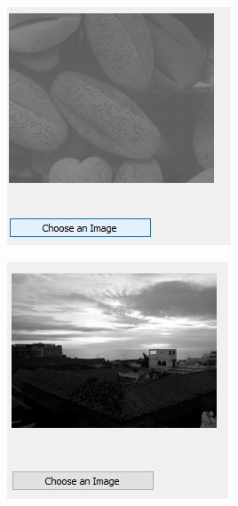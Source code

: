 \documentclass{article}
\newenvironment{Figure}
  {\par\medskip\noindent\ignorespaces\minipage{\linewidth}}
  {\endminipage\par\medskip}
\begin{document}
\begin{multicols*}{2}
\begin{Figure}
 \centering
 \includegraphics[width=\linewidth]{OriginalImage.jpg}
\end{Figure}

\begin{Figure}
 \centering
 \includegraphics[width=\linewidth]{OriginalImage2.jpg}
\end{Figure}


\end{multicols*}
\end{document}
